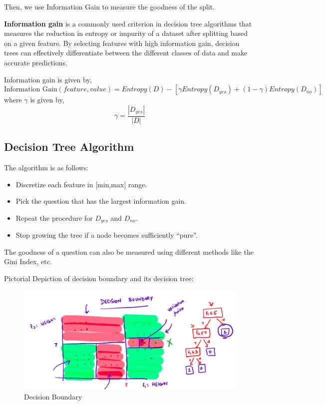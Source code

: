 \documentclass[
]{article}
\providecommand{\tightlist}{%
  \setlength{\itemsep}{0pt}\setlength{\parskip}{0pt}}
\begin{document}
Then, we use Information Gain to measure the goodness of the split.

\textbf{Information gain} is a commonly used criterion in decision tree
algorithms that measures the reduction in entropy or impurity of a
dataset after splitting based on a given feature. By selecting features
with high information gain, decision trees can effectively differentiate
between the different classes of data and make accurate predictions.

Information gain is given by, \[
\text{Information Gain}(feature,value)=Entropy(D) - \left [ \gamma Entropy(D_{yes})+(1-\gamma)Entropy(D_{no}) \right ]
\] where \(\gamma\) is given by, \[
\gamma=\frac{|D_{yes}|}{|D|}
\]

\hypertarget{decision-tree-algorithm}{%
\subsection{Decision Tree Algorithm}\label{decision-tree-algorithm}}

The algorithm is as follows:

\begin{itemize}
\tightlist
\item
  Discretize each feature in {[}min,max{]} range.
\item
  Pick the question that has the largest information gain.
\item
  Repeat the procedure for \(D_{yes}\) and \(D_{no}\).
\item
  Stop growing the tree if a node becomes sufficiently ``pure''.
\end{itemize}

The goodness of a question can also be measured using different methods
like the Gini Index, etc.

Pictorial Depiction of decision boundary and its decision tree:

\begin{figure}
\centering
\includegraphics{../images/decision_bound.png}
\caption{Decision Boundary}
\end{figure}
\end{document}
